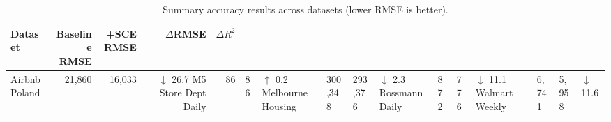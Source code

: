 \begin{table}[htbp]
\centering
\caption{Summary accuracy results across datasets (lower RMSE is better).}
\label{tab:results}
\begin{tabular}{lrrrr}
\toprule
Dataset & Baseline RMSE & +SCE RMSE & $\Delta$RMSE & $\Delta R^2$ \\
\midrule
Airbnb Poland & 21,860 & 16,033 & $\downarrow$ 26.7%
M5 Store Dept Daily & 86 & 86 & $\uparrow$ 0.2%
Melbourne Housing & 300,348 & 293,376 & $\downarrow$ 2.3%
Rossmann Daily & 872 & 776 & $\downarrow$ 11.1%
Walmart Weekly & 6,741 & 5,958 & $\downarrow$ 11.6%
\bottomrule
\end{tabular}
\end{table}